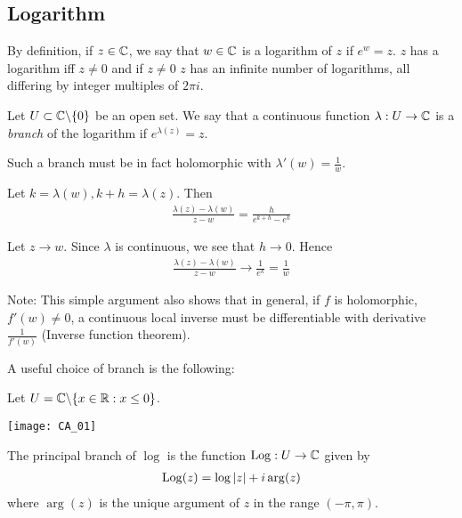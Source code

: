\documentclass[a4paper]{article}
\begin{document}
\subsection{Logarithm}

\begin{defi}
By definition, if $z \in \mathbb{C}$, we say that $w \in \mathbb{C}$ is a logarithm of $z$ if $e^w = z$. $z$ has a logarithm iff $z \neq 0$ and if $z \neq 0$ $z$ has an infinite number of logarithms, all differing by integer multiples of $2\pi i$.
\end{defi}

\begin{defi}
Let $U \subset \mathbb{C} \backslash \{0\}$ be an open set. We say that a continuous function $\lambda: U \to \mathbb{C}$ is a \emph{branch} of the logarithm if $e^{\lambda(z)} = z$.
\end{defi}

\begin{rem}
Such a branch must be in fact holomorphic with $\lambda' (w) = \frac{1}{w}$.

Let $k=\lambda(w), k+h = \lambda(z)$. Then
\begin{equation*}
\begin{aligned}
\frac{\lambda(z)-\lambda(w)}{z-w}=\frac{h}{e^{k+h}-e^k}
\end{aligned}
\end{equation*}
\end{rem}

Let $z \to w$. Since $\lambda$ is continuous, we see that $h \to 0$. Hence
\begin{equation*}
\begin{aligned}
\frac{\lambda(z)-\lambda(w)}{z-w} \to \frac{1}{e^k} = \frac{1}{w}
\end{aligned}
\end{equation*}

Note: This simple argument also shows that in general, if $f$ is holomorphic, $f'(w) \neq 0$, a continuous local inverse must be differentiable with derivative $\frac{1}{f'(w)}$ (Inverse function theorem).

A useful choice of branch is the following:

\begin{defi}
Let $U = \mathbb{C} \backslash \{x \in \mathbb{R}: x \leq 0\}$.

\texttt{[image: CA\_01]}

The principal branch of $\log$ is the function $\operatorname{Log}: U \to \mathbb{C}$ given by
\begin{equation*}
\begin{aligned}
\operatorname{Log}(z) = \log|z| + i\arg(z)
\end{aligned}
\end{equation*}
where $\arg(z)$ is the unique argument of $z$ in the range $(-\pi,\pi)$.
\end{defi}
\end{document}
